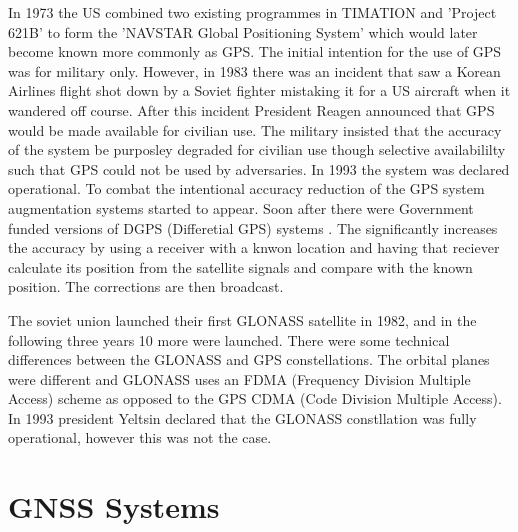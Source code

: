 In 1973 the US combined two existing programmes in TIMATION and 'Project 621B' to form the 'NAVSTAR Global Positioning System' which would later become known more
commonly as GPS. The initial intention for the use of GPS was for military only. However, in 1983 there was an incident that saw a Korean Airlines flight shot down by a
Soviet fighter mistaking it for a US aircraft when it wandered off course. After this incident President Reagen announced that GPS would be made available for civilian
use. The military insisted that the accuracy of the system be purposley degraded for civilian use though selective availabililty such that GPS could not be used by
adversaries. In 1993 the system was declared operational. To combat the intentional accuracy reduction of the GPS system augmentation systems started to appear. Soon
after there were Government funded versions of DGPS (Differetial GPS) systems \cite{RN43}. The significantly increases the accuracy by using a receiver with a knwon
location and having that reciever calculate its position from the satellite signals and compare with the known position. The corrections are then broadcast. 

The soviet union launched their first GLONASS satellite in 1982, and in the following three years 10 more were launched. There were some technical differences between the
GLONASS and GPS constellations. The orbital planes were different and GLONASS uses an FDMA (Frequency Division Multiple Access) scheme as opposed to the GPS CDMA (Code
Division Multiple Access). In 1993 president Yeltsin declared that the GLONASS constllation was fully operational, however this was not the case. 



\section{GNSS Systems}
